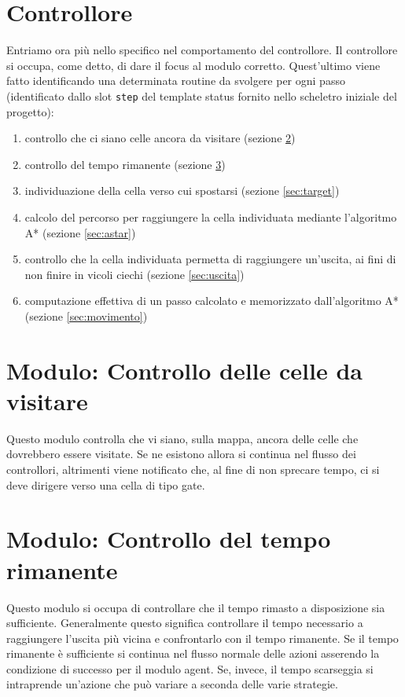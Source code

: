 \section{Controllore} \label{sec:controllore}
Entriamo ora più nello specifico nel comportamento del controllore. Il controllore si occupa, come detto, di dare il focus al modulo corretto. Quest'ultimo viene fatto identificando una determinata routine da svolgere per ogni passo (identificato dallo slot \texttt{step} del template status fornito nello scheletro iniziale del progetto):
\begin{enumerate}
	\item controllo che ci siano celle ancora da visitare (sezione \ref{sec:finish})
	\item controllo del tempo rimanente (sezione \ref{sec:tempo})
	\item individuazione della cella verso cui spostarsi (sezione \ref{sec:target})
	\item calcolo del percorso per raggiungere la cella individuata mediante l'algoritmo A* (sezione \ref{sec:astar})
	\item controllo che la cella individuata permetta di raggiungere un'uscita, ai fini di non finire in vicoli ciechi (sezione \ref{sec:uscita})
	\item computazione effettiva di un passo calcolato e memorizzato dall'algoritmo A* (sezione \ref{sec:movimento})
\end{enumerate}

\section{Modulo: Controllo delle celle da visitare} \label{sec:finish}
Questo modulo controlla che vi siano, sulla mappa, ancora delle celle che dovrebbero essere visitate. Se ne esistono allora si continua nel flusso dei controllori, altrimenti viene notificato che, al fine di non sprecare tempo, ci si deve dirigere verso una cella di tipo gate.

\section{Modulo: Controllo del tempo rimanente} \label{sec:tempo}
Questo modulo si occupa di controllare che il tempo rimasto a disposizione sia sufficiente. Generalmente questo significa controllare il tempo necessario a raggiungere l'uscita più vicina e confrontarlo con il tempo rimanente. Se il tempo rimanente è sufficiente si continua nel flusso normale delle azioni asserendo la condizione di successo per il modulo agent. Se, invece, il tempo scarseggia si intraprende un'azione che può variare a seconda delle varie strategie.

